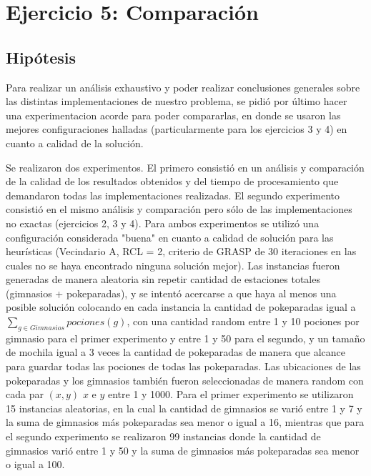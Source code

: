 \section{Ejercicio 5: Comparación}


    \subsection{Hipótesis}
        Para realizar un análisis exhaustivo y poder realizar conclusiones generales sobre las distintas implementaciones de nuestro problema, se pidió por último hacer una experimentacion acorde para poder compararlas, en donde se usaron las mejores configuraciones halladas (particularmente para los ejercicios 3 y 4) en cuanto a calidad de la solución.

        Se realizaron dos experimentos. El primero consistió en un análisis y comparación de la calidad de los resultados obtenidos y del tiempo de procesamiento que demandaron todas las implementaciones realizadas. El segundo experimento consistió en el mismo análisis y comparación pero sólo de las implementaciones no exactas (ejercicios 2, 3 y 4). Para ambos experimentos se utilizó una configuración considerada "buena" en cuanto a calidad de solución para las heurísticas (Vecindario A, RCL = 2, criterio de GRASP de 30 iteraciones en las cuales no se haya encontrado ninguna solución mejor).
        Las instancias fueron generadas de manera aleatoria sin repetir cantidad de estaciones totales (gimnasios + pokeparadas), y se intentó acercarse a que haya al menos una posible solución colocando en cada instancia la cantidad de pokeparadas igual a $\sum_{g \in Gimnasios} pociones(g)$, con una cantidad random entre 1 y 10 pociones por gimnasio para el primer experimento y entre 1 y 50 para el segundo, y un tamaño de mochila igual a 3 veces la cantidad de pokeparadas de manera que alcance para guardar todas las pociones de todas las pokeparadas. Las ubicaciones de las pokeparadas y los gimnasios también fueron seleccionadas de manera random con cada par $(x,y)$ $x$ e $y$ entre 1 y 1000. Para el primer experimento se utilizaron 15 instancias aleatorias, en la cual la cantidad de gimnasios se varió entre 1 y 7 y la suma de gimnasios más pokeparadas sea menor o igual a 16, mientras que para el segundo experimento se realizaron 99 instancias donde la cantidad de gimnasios varió entre 1 y 50 y la suma de gimnasios más pokeparadas sea menor o igual a 100.

